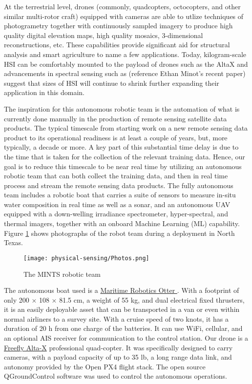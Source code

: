 At the terrestrial level, drones (commonly, quadcopters, octocopters, and other similar multi-rotor craft) equipped with cameras are able to utlize techniques of photogrametry together with continuously sampled imagery to produce high quality digital elevation maps, high quality mosaics, 3-dimensional reconstructions, etc. These capabilities provide significant aid for structural analysis and smart agriculture to name a few applications. Today, kilogram-scale HSI can be comfortably mounted to the payload of drones such as the AltaX and advancements in spectral sensing such as (reference Ethan Minot's recent paper) suggest that sizes of HSI will continue to shrink further expanding their application in this domain.

The inspiration for this autonomous robotic team is the automation of what is currently done manually in the production of remote sensing satellite data products. The typical timescale from starting work on a new remote sensing data product to its operational readiness is at least a couple of years, but, more typically, a decade or more. A key part of this substantial time delay is due to the time that is taken for the collection of the relevant training data. Hence, our goal is to reduce this timescale to be near real time by utilizing an autonomous robotic team that can both collect the training data, and then in real time process and stream the remote sensing data products. The fully autonomous team includes a robotic boat that carries a suite of sensors to measure in-situ water composition in real time as well as a sonar, and an autonomous UAV equipped with a down-welling irradiance spectrometer, hyper-spectral, and thermal imagers, together with an onboard Machine Learning (ML) capability. Figure \ref{fig:drone-team} shows photographs of the robot team during a deployment in North Texas.

\begin{figure}[!hbt]
  \centering
  \texttt{[image: physical-sensing/Photos.png]}
  \caption{The MINTS robotic team}
  \label{fig:drone-team}
\end{figure}

The autonomous boat used is a \href{https://www.maritimerobotics.com/otter}{Maritime Robotics Otter }. With a footprint of only 200 × 108 × 81.5 cm, a weight of 55 kg, and dual electrical fixed thrusters, it is an easily deployable asset that can be transported in a van or even within normal airliners to a survey site. With a cruise speed of two knots, it has a duration of 20 h from one charge of the batteries. It can use WiFi, cellular, and an optional AIS receiver for communication to the control station. Our drone is a \href{https://freeflysystems.com/alta-x}{Freefly Alta-X} professional quad-copter. It was specifically designed to carry cameras, with a payload capacity of up to 35 lb, a long range data link, and autonomy provided by the Open PX4 flight stack. The open source QGroundControl software was used to control the autonomous operations.

